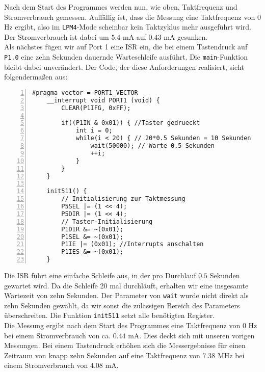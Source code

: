 \documentclass[11pt,a4paper,ngerman]{article}
\begin{document}
\begin{description}
	Nach dem Start des Programmes werden nun, wie oben, Taktfrequenz und Stromverbrauch gemessen. Auffällig ist, dass die Messung eine Taktfrequenz von $0$ Hz ergibt, also im \texttt{LPM4}-Mode scheinbar kein Taktzyklus mehr ausgeführt wird. Der Stromverbrauch ist dabei um $5.4$ mA auf $0.43$ mA gesunken.\\

	
	Als nächstes fügen wir auf Port 1 eine ISR ein, die bei einem Tastendruck auf \texttt{P1.0} eine zehn Sekunden dauernde Warteschleife ausführt. Die \texttt{main}-Funktion bleibt dabei unverändert. Der Code, der diese Anforderungen realisiert, sieht folgendermaßen aus:
	\begin{lstlisting}[numbers=left]
	#pragma vector = PORT1_VECTOR
	__interrupt void PORT1 (void) {
		CLEAR(P1IFG, 0xFF);

		if((P1IN & 0x01)) { //Taster gedrueckt
			int i = 0;
			while(i < 20) { // 20*0.5 Sekunden = 10 Sekunden
				wait(50000); // Warte 0.5 Sekunden
				++i;
			}
		}
	}
	
	init511() {
		// Initialisierung zur Taktmessung
		P5SEL |= (1 << 4);
		P5DIR |= (1 << 4);
		// Taster-Initialisierung
		P1DIR &= ~(0x01);
		P1SEL &= ~(0x01);
		P1IE |= (0x01); //Interrupts anschalten
		P1IES &= ~(0x01);
	}
	\end{lstlisting}
	
	Die ISR führt eine einfache Schleife aus, in der pro Durchlauf $0.5$ Sekunden gewartet wird. Da die Schleife 20 mal durchläuft, erhalten wir eine insgesamte Wartezeit von zehn Sekunden. Der Parameter von \texttt{wait} wurde nicht direkt als zehn Sekunden gewählt, da wir sonst die zulässigen Bereich des Parameters überschreiten. Die Funktion \texttt{init511} setzt alle benötigten Register. \\
	Die Messung ergibt nach dem Start des Programmes eine Taktfrequenz von $0$ Hz bei einem Stromverbrauch von ca. $0.44$ mA. Dies deckt sich mit unseren vorigen Messungen. Bei einem Tastendruck erhöhen sich die Messergebnisse für einen Zeitraum von knapp zehn Sekunden auf eine Taktfrequenz von $7.38$ MHz bei einem Stromverbrauch von $4.08$ mA.
\end{description}
\end{document}
